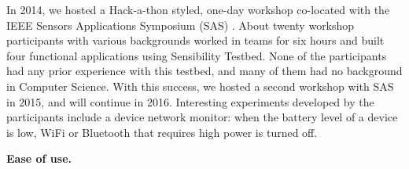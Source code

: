 In 2014, we hosted a Hack-a-thon styled, one-day workshop co-located with 
the IEEE Sensors Applications Symposium (SAS) \cite{sas}. About twenty 
workshop participants with various backgrounds worked in teams 
for six hours and built four functional applications using Sensibility 
Testbed. None of the participants had any prior experience with 
this testbed, and many of them had no background in Computer
Science. With this success, we hosted a second workshop with 
SAS in 2015, and will continue in 2016. Interesting experiments 
developed by the participants include a device network monitor: 
when the battery level of a device is low, WiFi or Bluetooth that 
requires high power is turned off.

\textbf{Ease of use.}


